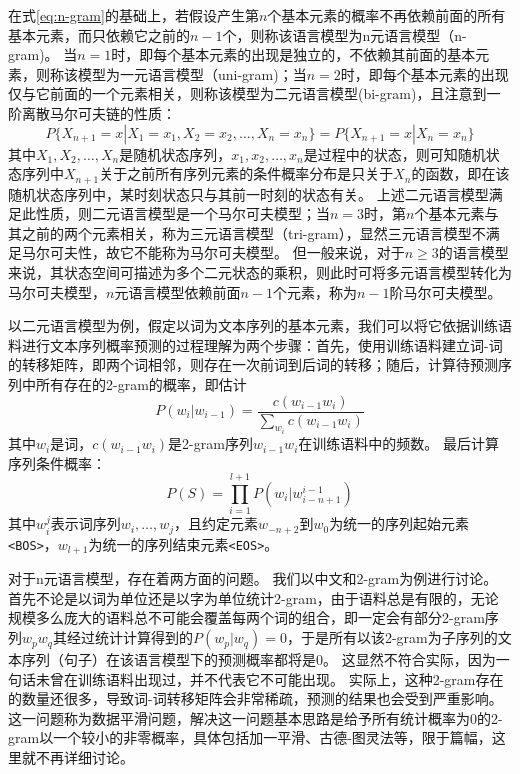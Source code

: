 在式\ref{eq:n-gram}的基础上，若假设产生第$n$个基本元素的概率不再依赖前面的所有基本元素，而只依赖它之前的$n-1$个，则称该语言模型为n元语言模型（n-gram)。
当$n=1$时，即每个基本元素的出现是独立的，不依赖其前面的基本元素，则称该模型为一元语言模型（uni-gram)；当$n=2$时，即每个基本元素的出现仅与它前面的一个元素相关，则称该模型为二元语言模型(bi-gram)，且注意到一阶离散马尔可夫链的性质：
\begin{equation}
    P\{X_{n+1} = x|X_1 = x_1, X_2 = x_2, \dots, X_n = x_n\} = P\{X_{n+1} = x| X_n = x_n\}
\end{equation}
其中$X_1, X_2, \dots , X_n$是随机状态序列，$x_1, x_2, \dots, x_n$是过程中的状态，则可知随机状态序列中$X_{n+1}$关于之前所有序列元素的条件概率分布是只关于${X_n}$的函数，即在该随机状态序列中，某时刻状态只与其前一时刻的状态有关。
上述二元语言模型满足此性质，则二元语言模型是一个马尔可夫模型；当$n=3$时，第$n$个基本元素与其之前的两个元素相关，称为三元语言模型（tri-gram），显然三元语言模型不满足马尔可夫性，故它不能称为马尔可夫模型。
但一般来说，对于$n\geq 3$的语言模型来说，其状态空间可描述为多个二元状态的乘积，则此时可将多元语言模型转化为马尔可夫模型，$n$元语言模型依赖前面$n-1$个元素，称为$n-1$阶马尔可夫模型。

以二元语言模型为例，假定以词为文本序列的基本元素，我们可以将它依据训练语料进行文本序列概率预测的过程理解为两个步骤：首先，使用训练语料建立词-词的转移矩阵，即两个词相邻，则存在一次前词到后词的转移；随后，计算待预测序列中所有存在的2-gram的概率，即估计
\begin{equation}
    P(w_i|w_{i-1}) = \frac{c(w_{i-1}w_i)}{\sum_{w_i}c(w_{i-1}w_i)}
\end{equation}
其中$w_i$是词，$c(w_{i-1}w_i)$是2-gram序列$w_{i-1}w_i$在训练语料中的频数。
最后计算序列条件概率：
\begin{equation}
    P(S) = \prod_{i=1}^{l+1}P(w_i|w^{i-1}_{i-n+1})
\end{equation}
其中$w^j_i$表示词序列$w_i,\dots,w_j$，且约定元素$w_{-n+2}$到$w_0$为统一的序列起始元素\verb|<BOS>|，$w_{l+1}$为统一的序列结束元素\verb|<EOS>|。

对于n元语言模型，存在着两方面的问题。
我们以中文和2-gram为例进行讨论。
首先不论是以词为单位还是以字为单位统计2-gram，由于语料总是有限的，无论规模多么庞大的语料总不可能会覆盖每两个词的组合，即一定会有部分2-gram序列$w_p w_q$其经过统计计算得到的$P(w_p|w_q)=0$，于是所有以该2-gram为子序列的文本序列（句子）在该语言模型下的预测概率都将是0。
这显然不符合实际，因为一句话未曾在训练语料出现过，并不代表它不可能出现。
实际上，这种2-gram存在的数量还很多，导致词-词转移矩阵会非常稀疏，预测的结果也会受到严重影响。
这一问题称为数据平滑问题，解决这一问题基本思路是给予所有统计概率为0的2-gram以一个较小的非零概率，具体包括加一平滑、古德-图灵法等，限于篇幅，这里就不再详细讨论。

